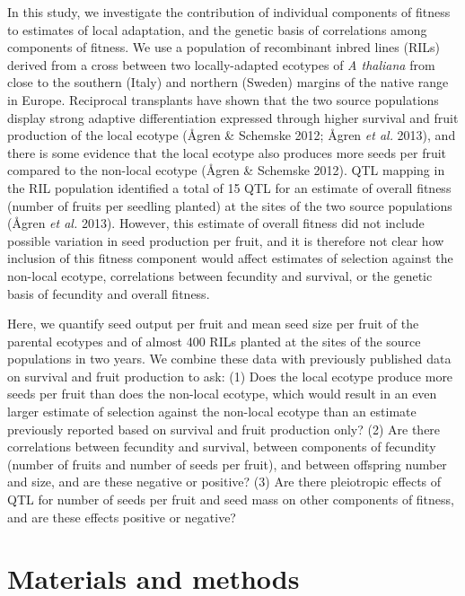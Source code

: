 \documentclass[
]{article}
\begin{document}
In this study, we investigate the contribution of individual components of fitness to estimates of local adaptation, and the genetic basis of correlations among components of fitness. We use a population of recombinant inbred lines (RILs) derived from a cross between two locally-adapted ecotypes of \emph{A thaliana} from close to the southern (Italy) and northern (Sweden) margins of the native range in Europe. Reciprocal transplants have shown that the two source populations display strong adaptive differentiation expressed through higher survival and fruit production of the local ecotype (Ågren \& Schemske 2012; Ågren \emph{et al.} 2013), and there is some evidence that the local ecotype also produces more seeds per fruit compared to the non-local ecotype (Ågren \& Schemske 2012). QTL mapping in the RIL population identified a total of 15 QTL for an estimate of overall fitness (number of fruits per seedling planted) at the sites of the two source populations (Ågren \emph{et al.} 2013). However, this estimate of overall fitness did not include possible variation in seed production per fruit, and it is therefore not clear how inclusion of this fitness component would affect estimates of selection against the non-local ecotype, correlations between fecundity and survival, or the genetic basis of fecundity and overall fitness.

Here, we quantify seed output per fruit and mean seed size per fruit of the parental ecotypes and of almost 400 RILs planted at the sites of the source populations in two years. We combine these data with previously published data on survival and fruit production to ask: (1) Does the local ecotype produce more seeds per fruit than does the non-local ecotype, which would result in an even larger estimate of selection against the non-local ecotype than an estimate previously reported based on survival and fruit production only? (2) Are there correlations between fecundity and survival, between components of fecundity (number of fruits and number of seeds per fruit), and between offspring number and size, and are these negative or positive? (3) Are there pleiotropic effects of QTL for number of seeds per fruit and seed mass on other components of fitness, and are these effects positive or negative?

\hypertarget{materials-and-methods}{%
\section{Materials and methods}\label{materials-and-methods}}
\end{document}

